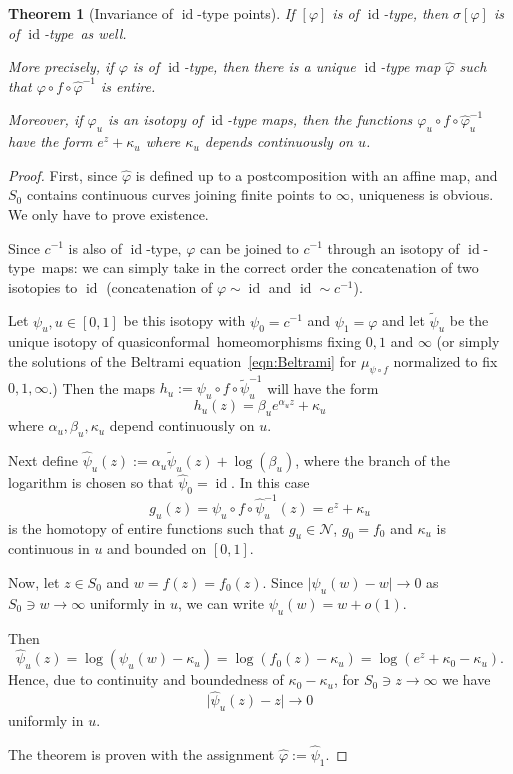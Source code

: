 \documentclass[10pt,reqno,a4paper]{amsart}
\numberwithin{figure}{section}
\numberwithin{equation}{section}
\newtheorem{thm}{Theorem}[section]
\newcommand{\qc}{quasiconformal}
\newcommand{\idt}{of $\id$-type}
\newcommand{\id}{\operatorname{id}}
\newcommand{\abs}[1]{\lvert #1 \rvert}
\begin{document}
\begin{thm}[Invariance of $\id$-type points]
	\label{thm:pullback_of_id_type}
	If $[\varphi]$ is \idt, then $\sigma[\varphi]$ is \idt\ as well.
	
	More precisely, if $\varphi$ is \idt, then there is a unique $\id$-type map $\hat{\varphi}$ such that $\varphi\circ f\circ\hat{\varphi}^{-1}$ is entire.
	
	Moreover, if $\varphi_u$ is an isotopy of $\id$-type maps, then the functions $\varphi_u\circ f\circ\hat{\varphi}_u^{-1}$ have the form $e^z+\kappa_u$ where $\kappa_u$ depends continuously on $u$.
\end{thm}
\begin{proof}
	First, since $\hat{\varphi}$ is defined up to a postcomposition with an affine map, and $S_0$ contains continuous curves joining finite points to $\infty$, uniqueness is obvious. We only have to prove existence.
	
	Since $c^{-1}$ is also \idt, $\varphi$ can be joined to $c^{-1}$ through an isotopy \idt\ maps: we can simply take in the correct order the concatenation of two isotopies to $\id$ (concatenation of $\varphi\sim\id$ and $\id\sim c^{-1}$).
	
	Let $\psi_u, u\in [0,1]$ be this isotopy with $\psi_0=c^{-1}$ and $\psi_1=\varphi$ and let $\tilde{\psi}_u$ be the unique isotopy of \qc\ homeomorphisms fixing $0,1$ and $\infty$ (or simply the solutions of the Beltrami equation~\ref{eqn:Beltrami} for $\mu_{\psi\circ f}$ normalized to fix $0,1,\infty$.) Then the maps $h_u:=\psi_u\circ f \circ \tilde{\psi}_u^{-1}$ will have the form 	
	$$h_u(z)=\beta_u e^{\alpha_u z}+\kappa_u$$ 	
	where $\alpha_u,\beta_u,\kappa_u$ depend continuously on $u$.
	
	Next define $\hat{\psi}_u(z):=\alpha_u\tilde{\psi}_u(z) +\log(\beta_u)$, where the branch of the logarithm is chosen so that $\hat{\psi}_0=\id$. In this case
	$$g_u(z)=\psi_u\circ f \circ \hat{\psi}_u^{-1}(z)=e^z+\kappa_u$$ 
	is the homotopy of entire functions such that $g_u\in\mathcal{N}$, $g_0=f_0$ and $\kappa_u$ is continuous in $u$ and bounded on $[0,1]$.	
	
	Now, let $z\in S_0$ and $w=f(z)=f_0(z)$. Since $\abs{\psi_u(w)-w}\to 0$ as $S_0\ni w\to\infty$ uniformly in $u$, we can write $\psi_u(w)=w+o(1)$.  
	
	Then	
	$$\hat{\psi}_u(z)=\log(\psi_u(w)-\kappa_u)=\log(f_0(z)-\kappa_u)=\log(e^z+\kappa_0-\kappa_u).$$
	Hence, due to continuity and boundedness of $\kappa_0-\kappa_u$, for $S_0\ni z\to\infty$ we have
	$$\abs{\hat{\psi}_u(z)-z}\to 0$$
	uniformly in $u$.
	
	The theorem is proven with the assignment $\hat{\varphi}:=\hat{\psi}_1$.
\end{proof}
\end{document}
